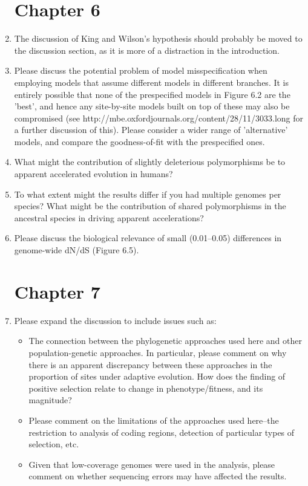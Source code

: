 \begin{enumerate}
\section{Chapter 6}

\item{ The discussion of King and Wilson's hypothesis should probably be
moved to the discussion section, as it is more of a distraction in the
introduction.}

\item{ Please discuss the potential problem of model misspecification when
employing models that assume different models in different
branches. It is entirely possible that none of the prespecified models
in Figure 6.2 are the 'best', and hence any site-by-site models built
on top of these may also be compromised (see
http://mbe.oxfordjournals.org/content/28/11/3033.long for a further
discussion of this). Please consider a wider range of 'alternative'
models, and compare the goodness-of-fit with the prespecified ones.}

\item{ What might the contribution of slightly deleterious polymorphisms be
to apparent accelerated evolution in humans?}

\item{ To what extent might the results differ if you had multiple genomes
per species? What might be the contribution of shared polymorphisms in
the ancestral species in driving apparent accelerations?}

\item{ Please discuss the biological relevance of small (0.01--0.05)
differences in genome-wide dN/dS (Figure 6.5).}

\section{Chapter 7}

\item{Please expand the discussion to include issues such as:
  \begin{itemize}
  \item{The connection between the phylogenetic approaches used here
    and other population-genetic approaches. In particular, please
    comment on why there is an apparent discrepancy between these
    approaches in the proportion of sites under adaptive
    evolution. How does the finding of positive selection relate to
    change in phenotype/fitness, and its magnitude?}
  \item{Please comment on the limitations of the approaches used
    here--the restriction to analysis of coding regions, detection of
    particular types of selection, etc.}
  \item{Given that low-coverage genomes were used in the analysis,
    please comment on whether sequencing errors may have affected the
    results.}
  \end{itemize}
}


\end{enumerate}
